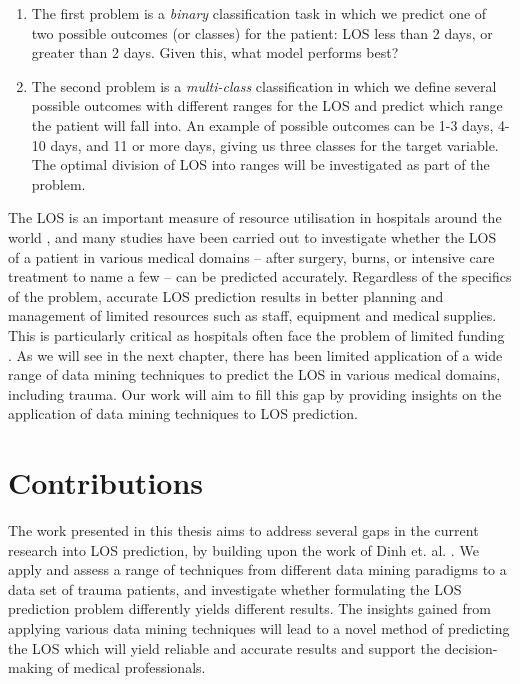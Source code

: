 \begin{enumerate}
\item The first problem is a \textit{binary} classification task in which we
predict one of two possible outcomes (or classes) for the patient: LOS less
than 2 days, or greater than 2 days. Given this, what model performs best?
\item The second problem is a \textit{multi-class} classification in which we
define several possible outcomes with different ranges for the LOS and predict
which range the patient will fall into. An example of possible outcomes can be
1-3 days, 4-10 days, and 11 or more days, giving us three classes for the
target variable. The optimal division of LOS into ranges will be investigated
as part of the problem.
\end{enumerate}

The LOS is an important measure of resource utilisation in hospitals around
the world \citep{Ng2006},
and many studies have been carried out to investigate whether the
LOS of a patient in various medical domains -- after surgery, burns, or
intensive care treatment to name a few -- can be predicted accurately.
Regardless of the
specifics of the problem, accurate LOS prediction results in better planning
and management of limited resources such as staff, equipment and medical
supplies. This is particularly critical as hospitals often face the problem
of limited funding \citep{Walczak2003}.
As we will see in the next chapter, there has been limited
application of a wide range of data mining techniques to predict the LOS in
various medical domains, including trauma. Our work will aim to fill this
gap by providing insights on the application of data mining techniques to
LOS prediction.

\section{Contributions}
The work presented in this thesis aims to address several gaps in the current
research into LOS prediction, by building upon the work of Dinh et. al.
\citep{Dinh2013a}.
We apply and assess a range of techniques from different data mining paradigms
to a data set of trauma patients, and investigate whether formulating the LOS
prediction problem differently yields different results. The insights gained
from applying various data mining techniques will lead to a novel method of
predicting the LOS which will yield reliable and accurate results and support
the decision-making of medical professionals.

